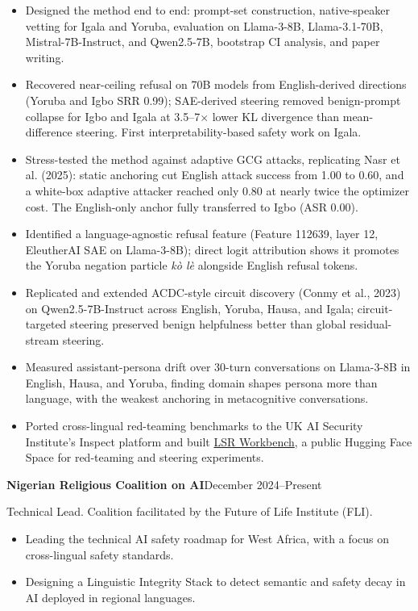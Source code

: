 \documentclass[11pt,letterpaper]{article}
\newcommand{\entrygap}{\par\vspace{3pt}}
\newcommand{\dated}[2]{\textbf{#1}\hfill #2\par}
\begin{document}
\begin{itemize}
  \item Designed the method end to end: prompt-set construction, native-speaker vetting for Igala and Yoruba, evaluation on Llama-3-8B, Llama-3.1-70B, Mistral-7B-Instruct, and Qwen2.5-7B, bootstrap CI analysis, and paper writing.
  \item Recovered near-ceiling refusal on 70B models from English-derived directions (Yoruba and Igbo SRR 0.99); SAE-derived steering removed benign-prompt collapse for Igbo and Igala at 3.5--7$\times$ lower KL divergence than mean-difference steering. First interpretability-based safety work on Igala.
  \item Stress-tested the method against adaptive GCG attacks, replicating Nasr et al. (2025): static anchoring cut English attack success from 1.00 to 0.60, and a white-box adaptive attacker reached only 0.80 at nearly twice the optimizer cost. The English-only anchor fully transferred to Igbo (ASR 0.00).
  \item Identified a language-agnostic refusal feature (Feature 112639, layer 12, EleutherAI SAE on Llama-3-8B); direct logit attribution shows it promotes the Yoruba negation particle \textit{k\`o l\`e} alongside English refusal tokens.
  \item Replicated and extended ACDC-style circuit discovery (Conmy et al., 2023) on Qwen2.5-7B-Instruct across English, Yoruba, Hausa, and Igala; circuit-targeted steering preserved benign helpfulness better than global residual-stream steering.
  \item Measured assistant-persona drift over 30-turn conversations on Llama-3-8B in English, Hausa, and Yoruba, finding domain shapes persona more than language, with the weakest anchoring in metacognitive conversations.
  \item Ported cross-lingual red-teaming benchmarks to the UK AI Security Institute's Inspect platform and built \href{https://huggingface.co/spaces/Faruna01/lsr-dashboard}{LSR Workbench}, a public Hugging Face Space for red-teaming and steering experiments.
\end{itemize}
\entrygap
\dated{Nigerian Religious Coalition on AI}{December 2024--Present}
Technical Lead. Coalition facilitated by the Future of Life Institute (FLI).
\begin{itemize}
  \item Leading the technical AI safety roadmap for West Africa, with a focus on cross-lingual safety standards.
  \item Designing a Linguistic Integrity Stack to detect semantic and safety decay in AI deployed in regional languages.
\end{itemize}
\end{document}
